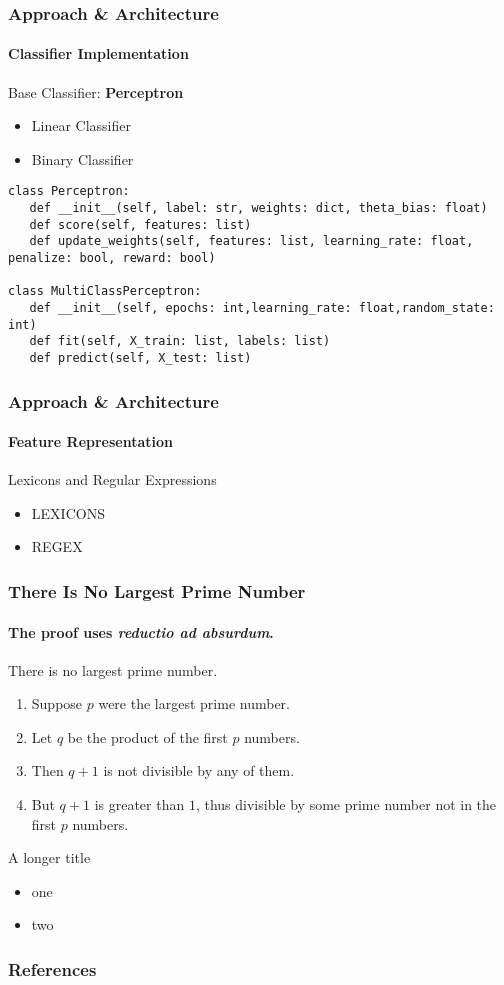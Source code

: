 \documentclass[
  xcolor={svgnames},
  hyperref={colorlinks,citecolor=DeepPink4,linkcolor=DarkRed,urlcolor=DarkBlue}
  ]{beamer}
\begin{document}
\begin{frame}[fragile]
\frametitle{Approach \& Architecture}
\framesubtitle{Classifier Implementation}

Base Classifier: {\bf {\color{red} Perceptron}}
\begin{itemize}
	\item Linear Classifier
	\item Binary Classifier
\end{itemize}
\bigskip

\begin{verbatim}
class Perceptron:
   def __init__(self, label: str, weights: dict, theta_bias: float)
   def score(self, features: list)
   def update_weights(self, features: list, learning_rate: float, penalize: bool, reward: bool)

class MultiClassPerceptron:
   def __init__(self, epochs: int,learning_rate: float,random_state: int)
   def fit(self, X_train: list, labels: list)
   def predict(self, X_test: list)

\end{verbatim}

\end{frame}



\begin{frame}[fragile]
\frametitle{Approach \& Architecture}
\framesubtitle{Feature Representation}

Lexicons and Regular Expressions

\begin{itemize}
	\item LEXICONS
	\item REGEX
\end{itemize}



\end{frame}



\begin{frame}
\frametitle{There Is No Largest Prime Number}
\framesubtitle{The proof uses \textit{reductio ad absurdum}.}
\begin{theorem}
There is no largest prime number. \end{theorem}
\begin{enumerate}
\item<1-| alert@1> Suppose $p$ were the largest prime number.
\item<2-> Let $q$ be the product of the first $p$ numbers.
\item<3-> Then $q+1$ is not divisible by any of them.
\item<1-> But $q + 1$ is greater than $1$, thus divisible by some prime
number not in the first $p$ numbers.
\end{enumerate}
\end{frame}

\begin{frame}{A longer title}
\begin{itemize}
\item one
\item two
\end{itemize}
\end{frame}


\begin{frame}[allowframebreaks]
   \frametitle{References}
   
   
\end{frame}
\end{document}
